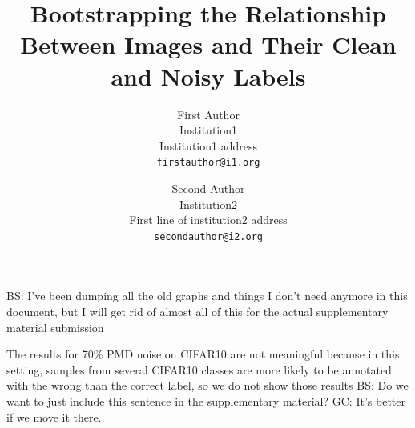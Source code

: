 \documentclass[10pt,twocolumn,letterpaper]{article}
\newcommand{\gustavo}[1]{{\color{blue}GC: #1}}
\newcommand{\brandon}[1]{{\color{orange}BS: #1}}
\begin{document}
\title{Bootstrapping the Relationship Between Images and Their Clean and Noisy Labels}

\author{First Author\\
Institution1\\
Institution1 address\\
{\tt\small firstauthor@i1.org}
\and
Second Author\\
Institution2\\
First line of institution2 address\\
{\tt\small secondauthor@i2.org}
}

\brandon{I've been dumping all the old graphs and things I don't need anymore in this document, but I will get rid of almost all of this for the actual supplementary material submission}

The results for 70\% PMD noise on CIFAR10 are not meaningful because in this setting, samples from several CIFAR10 classes are more likely to be annotated with the wrong than the correct label, so we do not show those results \brandon{Do we want to just include this sentence in the supplementary material?} \gustavo{It's better if we move it there.}. 
\end{document}
